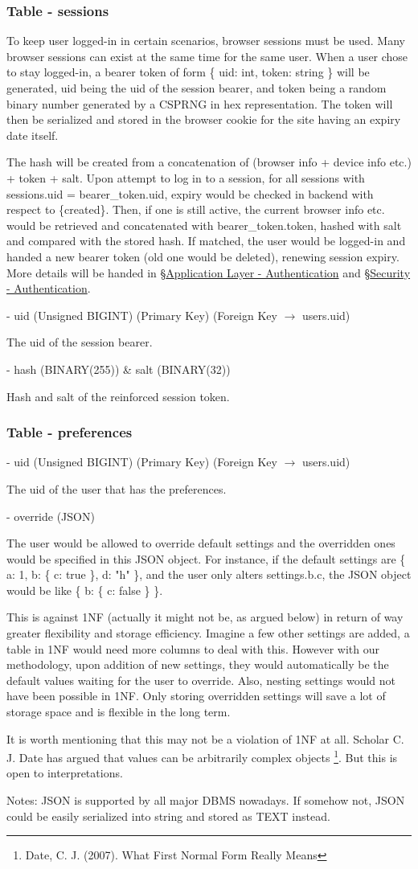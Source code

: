 \documentclass[12pt]{report}
\newcommand{\n}{\par}
\newcommand{\br}{\n\vspace{1 em}\n}
\begin{document}
\subsubsection{Table - sessions} \label{data-layer.design.user-system.sessions}
To keep user logged-in in certain scenarios, browser sessions must be used.
Many browser sessions can exist at the same time for the same user.
When a user chose to stay logged-in, a bearer token of form
\{ uid: int, token: string \}
will be generated,
uid being the uid of the session bearer, and
token being a random binary number generated by a CSPRNG in hex representation.
The token will then be serialized and stored in the browser cookie for the site having an expiry date itself.\n
The hash will be created from a concatenation of (browser info + device info etc.) + token + salt.
Upon attempt to log in to a session,
for all sessions with sessions.uid = bearer\_token.uid,
expiry would be checked in backend with respect to \{created\}.
Then, if one is still active, the current browser info etc. would be retrieved and concatenated with bearer\_token.token,
hashed with salt and compared with the stored hash.
If matched, the user would be logged-in and handed a new bearer token (old one would be deleted), renewing session expiry.
More details will be handed in \S \hyperref[application-layer.implementation.authentication]{Application Layer - Authentication} and
\S \hyperref[security.authentication]{Security - Authentication}.
\br
- uid (Unsigned BIGINT) (Primary Key) (Foreign Key $\rightarrow$ users.uid)\n
The uid of the session bearer.
\br
- hash (BINARY(255)) \& salt (BINARY(32))\n
Hash and salt of the reinforced session token.

\subsubsection{Table - preferences} \label{data-layer.design.user-system.preferences}
- uid (Unsigned BIGINT) (Primary Key) (Foreign Key $\rightarrow$ users.uid)\n
The uid of the user that has the preferences.
\br
- override (JSON)\n
The user would be allowed to override default settings and the overridden ones would be specified in this JSON object.
For instance, if the default settings are \{ a: 1, b: \{ c: true \}, d: "h" \},
and the user only alters settings.b.c, the JSON object would be like \{ b: \{ c: false \} \}.\n
This is against 1NF (actually it might not be, as argued below) in return of way greater flexibility and storage efficiency.
Imagine a few other settings are added, a table in 1NF would need more columns to deal with this.
However with our methodology, upon addition of new settings, they would automatically be the default values waiting for the user to override.
Also, nesting settings would not have been possible in 1NF.
Only storing overridden settings will save a lot of storage space and is flexible in the long term.\n
It is worth mentioning that this may not be a violation of 1NF at all.
Scholar C. J. Date has argued that values can be arbitrarily complex objects \footnote{Date, C. J. (2007). What First Normal Form Really Means}.
But this is open to interpretations.\n
Notes: JSON is supported by all major DBMS nowadays. If somehow not, JSON could be easily serialized into string and stored as TEXT instead.
\end{document}
